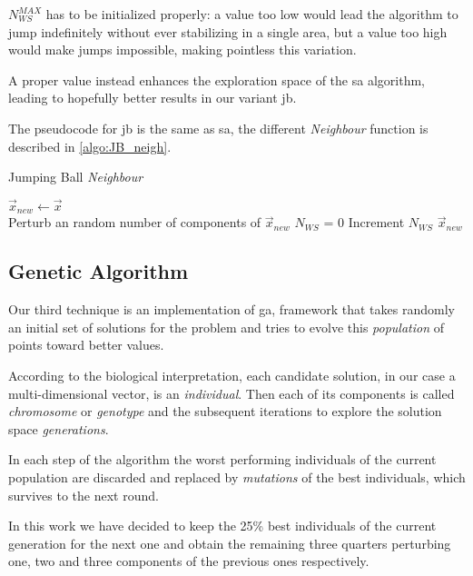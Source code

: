 \documentclass[12pt,journal,draftclsnofoot,onecolumn]{IEEEtran}
\begin{document}
$N_{WS}^{MAX}$ has to be initialized properly: a value too low would lead the algorithm to jump indefinitely without ever stabilizing in a single area, but a value too high would make jumps impossible, making pointless this variation.

A proper value instead enhances the exploration space of the \gls{sa} algorithm, leading to hopefully better results in our variant \gls{jb}.

The pseudocode for \gls{jb} is the same as \gls{sa}, the different \emph{Neighbour} function is described in \autoref{algo:JB_neigh}.

\begin{algorithm}
	\caption{Jumping Ball \emph{Neighbour}}\label{algo:JB_neigh}
	 {
		$\vec{x}_{new} \gets \vec{x}$ \\
		 {
			 {
				Perturb an random number of components of $\vec{x}_{new}$
			}
			$N_{WS}$ = 0
		}
	}
	 {
		Increment $N_{WS}$
	}
	\Return $\vec{x}_{new}$
\end{algorithm}

\subsection{Genetic Algorithm}

Our third technique is an implementation of \gls{ga}, framework that takes randomly an initial set of solutions for the problem and tries to evolve this \emph{population} of points toward better values.

According to the biological interpretation, each candidate solution, in our case a multi-dimensional vector, is an \emph{individual}.
Then each of its components is called \emph{chromosome} or \emph{genotype} and the subsequent iterations to explore the solution space \emph{generations}.

In each step of the algorithm the worst performing individuals of the current population are discarded and replaced by \emph{mutations} of the best individuals, which survives to the next round.

In this work we have decided to keep the 25\% best individuals of the current generation for the next one and obtain the remaining three quarters perturbing one, two and three components of the previous ones respectively.
\end{document}
